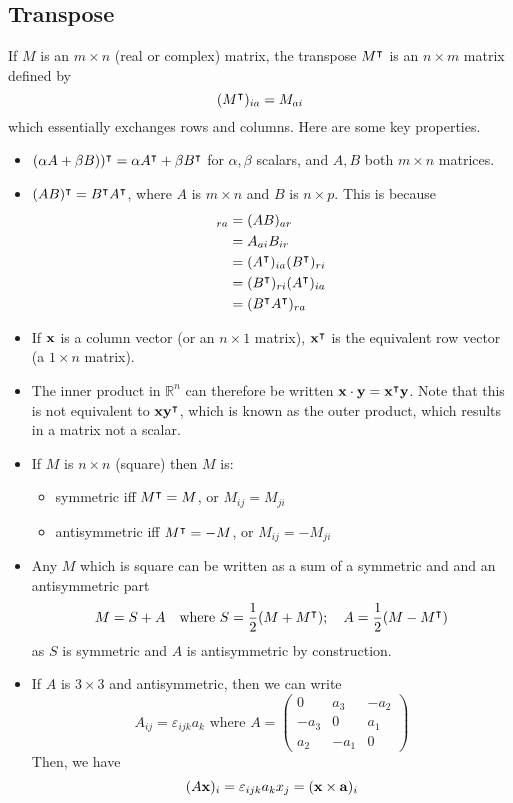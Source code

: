 \documentclass{article}
\begin{document}
\subsection{Transpose}
If $M$ is an $m \times n$ (real or complex) matrix, the transpose $M^\intercal$ is an $n \times m$ matrix defined by
\[ (M^\intercal)_{ia} = M_{ai} \]
which essentially exchanges rows and columns. Here are some key properties.
\begin{itemize}
	\item $(\alpha A + \beta B))^\intercal = \alpha A^\intercal + \beta B^\intercal$ for $\alpha, \beta$ scalars, and $A, B$ both $m \times n$ matrices.
	\item $(AB)^\intercal = B^\intercal A^\intercal$, where $A$ is $m \times n$ and $B$ is $n \times p$. This is because
	      \begin{align*}
		      [(AB)^\transpose]_{ra} & = (AB)_{ar}                               \\
		                             & = A_{ai} B_{ir}                           \\
		                             & = (A^\transpose)_{ia} (B^\transpose)_{ri} \\
		                             & = (B^\transpose)_{ri} (A^\transpose)_{ia} \\
		                             & = (B^\transpose A^\transpose)_{ra}
	      \end{align*}
	\item If $\vb x$ is a column vector (or an $n \times 1$ matrix), $\vb x^\intercal$ is the equivalent row vector (a $1 \times n$ matrix).
	\item The inner product in $\mathbb R^n$ can therefore be written $\vb x \cdot \vb y = \vb x^\intercal \vb y$. Note that this is not equivalent to $\vb x \vb y^\intercal$, which is known as the outer product, which results in a matrix not a scalar.
	\item If $M$ is $n \times n$ (square) then $M$ is:
	      \begin{itemize}
		      \item symmetric iff $M^\intercal = M$, or $M_{ij} = M_{ji}$
		      \item antisymmetric iff $M^\intercal = -M$, or $M_{ij} = -M_{ji}$
	      \end{itemize}
	\item Any $M$ which is square can be written as a sum of a symmetric and and an antisymmetric part
	      \[ M = S + A\quad\text{where } S = \frac{1}{2}(M + M^\intercal);\quad A = \frac{1}{2}(M - M^\intercal) \]
	      as $S$ is symmetric and $A$ is antisymmetric by construction.
	\item If $A$ is $3 \times 3$ and antisymmetric, then we can write
	      \[ A_{ij} = \varepsilon_{ijk}a_k\text{ where } A = \begin{pmatrix}
			      0    & a_3  & -a_2 \\
			      -a_3 & 0    & a_1  \\
			      a_2  & -a_1 & 0
		      \end{pmatrix} \]
	      Then, we have
	      \[
		      (A \vb x)_i = \varepsilon_{ijk}a_k x_j = (\vb x \times \vb a)_i
	      \]
\end{itemize}
\end{document}
